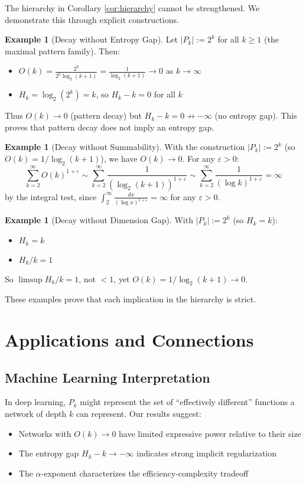 \documentclass[11pt]{article}
\theoremstyle{definition}
\newtheorem{example}[theorem]{Example}
\newcommand{\eps}{\varepsilon}
\begin{document}
The hierarchy in Corollary \ref{cor:hierarchy} cannot be strengthened. We demonstrate this through explicit constructions.

\begin{example}[Decay without Entropy Gap]\label{ex:no-gap}
Let $|P_k| := 2^k$ for all $k \geq 1$ (the maximal pattern family). Then:
\begin{itemize}
\item $O(k) = \frac{2^k}{2^k \log_2(k+1)} = \frac{1}{\log_2(k+1)} \to 0$ as $k \to \infty$
\item $H_k = \log_2(2^k) = k$, so $H_k - k = 0$ for all $k$
\end{itemize}
Thus $O(k) \to 0$ (pattern decay) but $H_k - k = 0 \not\to -\infty$ (no entropy gap). This proves that pattern decay does not imply an entropy gap.
\end{example}

\begin{example}[Decay without Summability]
With the construction $|P_k|:=2^k$ (so $O(k) = 1/\log_2(k+1)$), we have $O(k) \to 0$. For any $\eps>0$:
$$\sum_{k=2}^{\infty} O(k)^{1+\eps} \sim \sum_{k=2}^{\infty} \frac{1}{(\log_2(k+1))^{1+\eps}} \sim \sum_{k=2}^{\infty} \frac{1}{(\log k)^{1+\eps}}=\infty$$
by the integral test, since $\int_2^\infty \frac{dx}{(\log x)^{1+\eps}} = \infty$ for any $\eps > 0$.
\end{example}

\begin{example}[Decay without Dimension Gap]
With $|P_k|:=2^k$ (so $H_k = k$):
\begin{itemize}
\item $H_k = k$
\item $H_k/k = 1$
\end{itemize}
So $\limsup H_k/k=1$, not $<1$, yet $O(k) = 1/\log_2(k+1) \to 0$.
\end{example}

These examples prove that each implication in the hierarchy is strict.

\section{Applications and Connections}

\subsection{Machine Learning Interpretation}

In deep learning, $P_k$ might represent the set of ``effectively different'' functions a network of depth $k$ can represent. Our results suggest:
\begin{itemize}
\item Networks with $O(k)\to 0$ have limited expressive power relative to their size
\item The entropy gap $H_k-k\to-\infty$ indicates strong implicit regularization
\item The $\alpha$-exponent characterizes the efficiency-complexity tradeoff
\end{itemize}
\end{document}
